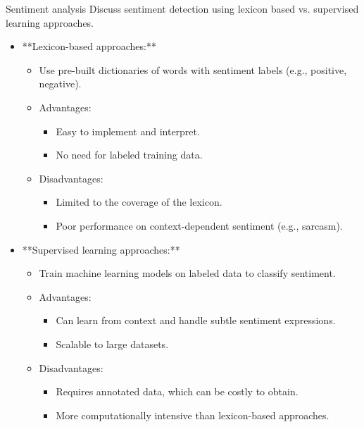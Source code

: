 \documentclass{article}
\begin{document}
\begin{exercise}{Sentiment analysis}
  Discuss sentiment detection using lexicon based vs. supervised learning approaches.

  \begin{solution}
    \begin{itemize}
        \item **Lexicon-based approaches:** 
        \begin{itemize}
            \item Use pre-built dictionaries of words with sentiment labels (e.g., positive, negative).
            \item Advantages:
                \begin{itemize}
                    \item Easy to implement and interpret.
                    \item No need for labeled training data.
                \end{itemize}
            \item Disadvantages:
                \begin{itemize}
                    \item Limited to the coverage of the lexicon.
                    \item Poor performance on context-dependent sentiment (e.g., sarcasm).
                \end{itemize}
        \end{itemize}
        \item **Supervised learning approaches:**
        \begin{itemize}
            \item Train machine learning models on labeled data to classify sentiment.
            \item Advantages:
                \begin{itemize}
                    \item Can learn from context and handle subtle sentiment expressions.
                    \item Scalable to large datasets.
                \end{itemize}
            \item Disadvantages:
                \begin{itemize}
                    \item Requires annotated data, which can be costly to obtain.
                    \item More computationally intensive than lexicon-based approaches.
                \end{itemize}
        \end{itemize}
    \end{itemize}
  \end{solution}
\end{exercise}
\end{document}
